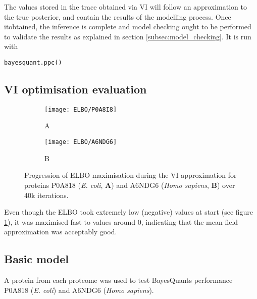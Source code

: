 The values stored in the trace obtained via VI will follow an approximation to the true posterior, and contain the results of the modelling process. Once it\textquotesingle obtained, the inference is complete and model checking ought to be performed to validate the results as explained in section \ref{subsec:model_checking}. It is run with

\begin{verbatim}
bayesquant.ppc()
\end{verbatim}


\subsection{VI optimisation evaluation}


\begin{figure}[H]
\begin{subfigure}{.45\textwidth}
\centering
\caption*{A}
\texttt{[image: ELBO/P0A8I8]}
\end{subfigure}
\begin{subfigure}{.45\textwidth}
\centering
\caption*{B}
\texttt{[image: ELBO/A6NDG6]}
\end{subfigure}
\caption[ELBO progression]{Progression of \ac{ELBO} maximisation during the \ac{VI} approximation for proteins P0A818 (\textit{E. coli}, \textbf{A}) and A6NDG6 (\textit{Homo sapiens}, \textbf{B}) over 40k iterations.}
\label{fig:ELBO}
\end{figure}

Even though the ELBO took extremely low (negative) values at start (see figure \ref{fig:ELBO}), it was maximised fast to values around 0, indicating that the mean-field approximation was acceptably good.

\subsection{Basic model}
\label{subsec:basic_model}

A protein from each proteome was used to test BayesQuant\textquotesingle s performance P0A818 (\textit{E. coli}) and A6NDG6 (\textit{Homo sapiens}).


